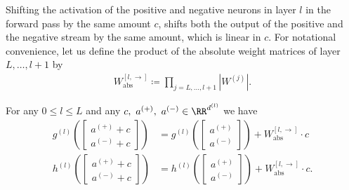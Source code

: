 Shifting the activation of the positive and negative neurons in layer $l$ in the forward pass by the same amount $c$, shifts both the output of the positive and the negative stream by the same amount, which is linear in $c$. For notational convenience, let us define the product of the absolute weight matrices of layer $L,\dots,l+1$ by
\begin{align}
    W_{\text{abs}}^{[l, \rightarrow]} \coloneqq \prod_{ j = L, \dots, l+1} \left|W^{(j)}\right|. \label{eq:w_abs}
\end{align}

\begin{theorem} \label{thm:shift_forward}
    For any $0 \leq l \leq L$ and any $c, \ a^{(+)}, \ a^{(-)} \in \RR ^ {d^{(l)}}$ we have
    \begin{align}
        g^{(l)}\!\left( \begin{bmatrix} a^{(+)} + c \\ a^{(-)} + c \end{bmatrix} \right)
            &= g^{(l)}\!\left( \begin{bmatrix} a^{(+)} \\ a^{(-)} \end{bmatrix} \right)
            + W_{\text{abs}}^{[l, \rightarrow]} \cdot c \\
        h^{(l)}\!\left( \begin{bmatrix} a^{(+)} + c \\ a^{(-)} + c \end{bmatrix} \right)
            &= h^{(l)}\!\left( \begin{bmatrix} a^{(+)} \\ a^{(-)} \end{bmatrix} \right)
            + W_{\text{abs}}^{[l, \rightarrow]} \cdot c.
    \end{align}
\end{theorem}

